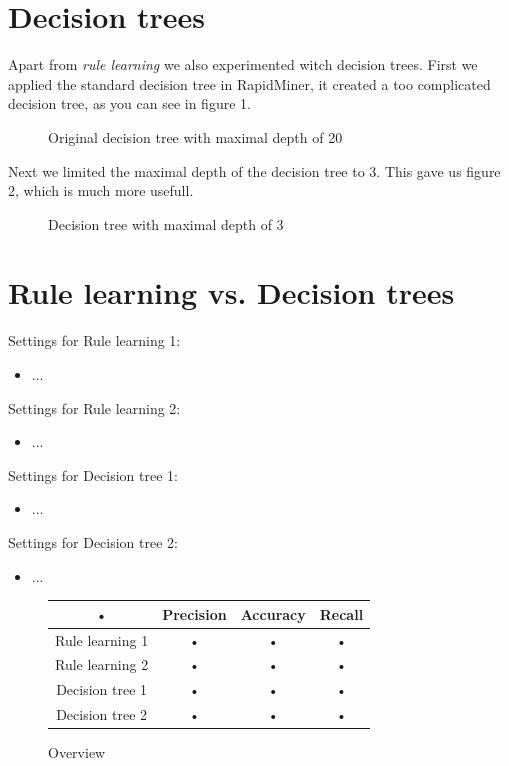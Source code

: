 \documentclass[12pt,a4paper]{article}
\begin{document}
\section{Decision trees}

Apart from \emph{rule learning} we also experimented witch decision trees. First we applied the standard decision tree in RapidMiner, it created a too complicated decision tree, as you can see in figure 1.
\begin{figure}[H]
  \centering
  
  \caption{Original decision tree with maximal depth of 20}
\end{figure}
Next we limited the maximal depth of the decision tree to 3. This gave us figure 2, which is much more usefull.
\begin{figure}[H]
  \centering
  
  \caption{Decision tree with maximal depth of 3}
\end{figure}


\section{Rule learning vs. Decision trees}

Settings for Rule learning 1:
\begin{itemize}
\item ...
\end{itemize}

Settings for Rule learning 2:
\begin{itemize}
\item ...
\end{itemize}

Settings for Decision tree 1:
\begin{itemize}
\item ...
\end{itemize}

Settings for Decision tree 2:
\begin{itemize}
\item ...
\end{itemize}

\begin{figure}[H]
\centering
\begin{tabular}{|c|c|c|c|}
\hline 
• & Precision & Accuracy & Recall\\ 
\hline 
Rule learning 1 & • & • & • \\ 
\hline 
Rule learning 2 & • & • & • \\ 
\hline 
Decision tree 1 & • & • & • \\ 
\hline 
Decision tree 2 & • & • & • \\ 
\hline 
\end{tabular} 
\caption{Overview}
\end{figure}
\end{document}
